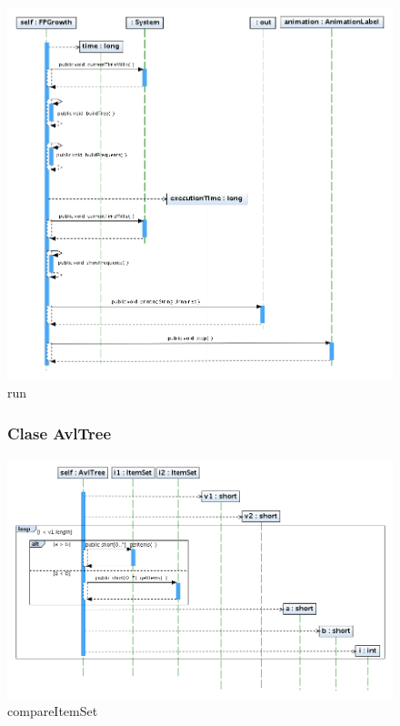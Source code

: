 \newpage
\begin{figure}
\centering
\includegraphics[width=1.2\textwidth]{imgsSecuencia/FPGrowth/run.png}
\caption{run}
\end{figure}
\newpage

\begin{figure}
\subsubsection{Clase AvlTree}
\includegraphics[width=1.2\textwidth]{imgsSecuencia/AvlTree/compareItemSet.png}
\caption{compareItemSet}
\end{figure}
\newpage


